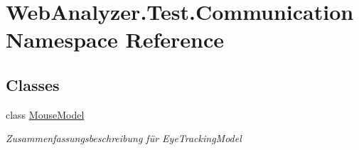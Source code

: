 \hypertarget{namespace_web_analyzer_1_1_test_1_1_communication}{}\section{Web\+Analyzer.\+Test.\+Communication Namespace Reference}
\label{namespace_web_analyzer_1_1_test_1_1_communication}
\subsection*{Classes}
\begin{DoxyCompactItemize}
\item 
class \hyperlink{class_web_analyzer_1_1_test_1_1_communication_1_1_mouse_model}{Mouse\+Model}
\begin{DoxyCompactList}\small\item\em Zusammenfassungsbeschreibung für Eye\+Tracking\+Model \end{DoxyCompactList}\end{DoxyCompactItemize}
